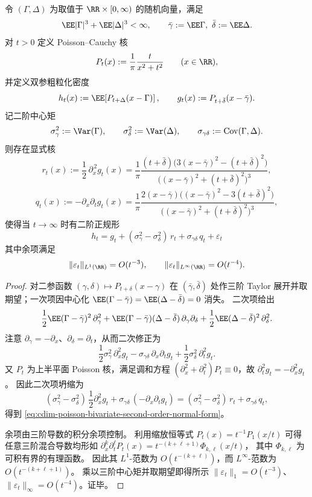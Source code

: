 \begin{proposition}\label{prop:cdim-poisson-bivariate-second-order-normal-form}
令 \((\Gamma,\Delta)\) 为取值于 \(\RR\times[0,\infty)\) 的随机向量，满足
\[
\EE|\Gamma|^3+\EE|\Delta|^3<\infty,
\qquad
\bar\gamma:=\EE\Gamma,\ \bar\delta:=\EE\Delta.
\]
对 \(t>0\) 定义 Poisson--Cauchy 核
\[
P_t(x):=\frac{1}{\pi}\frac{t}{x^2+t^2}\qquad(x\in\RR),
\]
并定义双参粗粒化密度
\[
h_t(x):=\EE\!\left[P_{t+\Delta}(x-\Gamma)\right],
\qquad
g_t(x):=P_{t+\bar\delta}(x-\bar\gamma).
\]
记二阶中心矩
\[
\sigma_\gamma^2:=\Var(\Gamma),\qquad
\sigma_\delta^2:=\Var(\Delta),\qquad
\sigma_{\gamma\delta}:=\mathrm{Cov}(\Gamma,\Delta).
\]
则存在显式核
\[
r_t(x):=\frac12\,\partial_x^{\,2} g_t(x)
=\frac{1}{\pi}\frac{(t+\bar\delta)\bigl(3(x-\bar\gamma)^2-(t+\bar\delta)^2\bigr)}{\bigl((x-\bar\gamma)^2+(t+\bar\delta)^2\bigr)^3},
\]
\[
q_t(x):=-\partial_x\partial_t g_t(x)
=\frac{1}{\pi}\frac{2(x-\bar\gamma)\bigl((x-\bar\gamma)^2-3(t+\bar\delta)^2\bigr)}{\bigl((x-\bar\gamma)^2+(t+\bar\delta)^2\bigr)^3},
\]
使得当 \(t\to\infty\) 时有二阶正规形
\begin{equation}\label{eq:cdim-poisson-bivariate-second-order-normal-form}
\boxed{\;
h_t
=
g_t
+(\sigma_\gamma^2-\sigma_\delta^2)\,r_t
+\sigma_{\gamma\delta}\,q_t
+\varepsilon_t\;}
\end{equation}
其中余项满足
\[
\|\varepsilon_t\|_{L^1(\RR)}=O(t^{-3}),
\qquad
\|\varepsilon_t\|_{L^\infty(\RR)}=O(t^{-4}).
\]
\end{proposition}
\begin{proof}
对二参函数 \((\gamma,\delta)\mapsto P_{t+\delta}(x-\gamma)\) 在 \((\bar\gamma,\bar\delta)\) 处作三阶 Taylor 展开并取期望；一次项因中心化 \(\EE(\Gamma-\bar\gamma)=\EE(\Delta-\bar\delta)=0\) 消失。
二次项给出
\[
\frac12\EE(\Gamma-\bar\gamma)^2\,\partial_\gamma^2
+\EE(\Gamma-\bar\gamma)(\Delta-\bar\delta)\,\partial_\gamma\partial_\delta
+\frac12\EE(\Delta-\bar\delta)^2\,\partial_\delta^2.
\]
注意 \(\partial_\gamma=-\partial_x\)、\(\partial_\delta=\partial_t\)，从而二次修正为
\[
\frac12\sigma_\gamma^2\,\partial_x^2 g_t
-\sigma_{\gamma\delta}\,\partial_x\partial_t g_t
+\frac12\sigma_\delta^2\,\partial_t^2 g_t.
\]
又 \(P_t\) 为上半平面 Poisson 核，满足调和方程 \((\partial_x^2+\partial_t^2)P_t\equiv 0\)，故 \(\partial_t^2 g_t=-\partial_x^2 g_t\)。
因此二次项坍缩为
\[
(\sigma_\gamma^2-\sigma_\delta^2)\,\frac12\partial_x^2 g_t
+\sigma_{\gamma\delta}\,(-\partial_x\partial_t g_t)
=(\sigma_\gamma^2-\sigma_\delta^2)\,r_t+\sigma_{\gamma\delta}\,q_t,
\]
得到 \eqref{eq:cdim-poisson-bivariate-second-order-normal-form}。
\par
余项由三阶导数的积分余项控制。
利用缩放恒等式 \(P_t(x)=t^{-1}P_1(x/t)\) 可得任意三阶混合导数均形如
\(
\partial_x^k\partial_t^\ell P_t(x)=t^{-(k+\ell+1)}\Phi_{k,\ell}(x/t)
\)，
其中 \(\Phi_{k,\ell}\) 为可积有界的有理函数。
因此其 \(L^1\)-范数为 \(O(t^{-(k+\ell)})\)，而 \(L^\infty\)-范数为 \(O(t^{-(k+\ell+1)})\)。
乘以三阶中心矩并取期望即得所示 \(\|\varepsilon_t\|_{1}=O(t^{-3})\)、\(\|\varepsilon_t\|_{\infty}=O(t^{-4})\)。证毕。
\end{proof}

